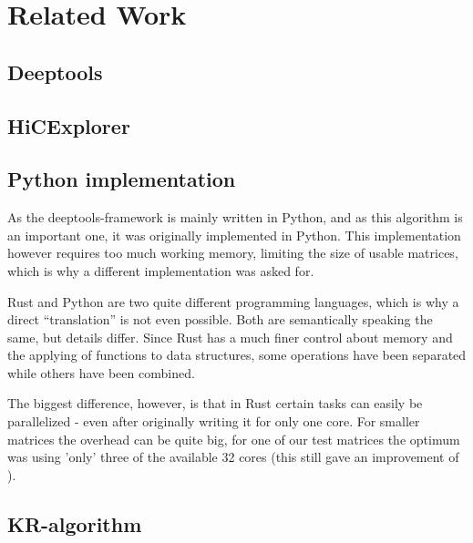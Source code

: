 \chapter{Related Work}\label{chap:relatedwork}


\section{Deeptools}\label{sec:deeptools}




\section{HiCExplorer}\label{sec:hicexplorer}

\section{Python implementation}\label{sec:python}

As the deeptools-framework is mainly written in Python, and as this algorithm
is an important one, it was originally implemented in Python. This
implementation however requires too much working memory, limiting the size of
usable matrices, which is why a different implementation was asked for.

Rust and Python are two quite different programming languages, which is why a
direct ``translation'' is not even possible. Both are semantically speaking the
same, but details differ. Since Rust has a much finer control about memory and
the applying of functions to data structures, some operations have been
separated while others have been combined.

The biggest difference, however, is that in Rust certain tasks can easily be
parallelized - even after originally writing it for only one core. For smaller
matrices the overhead can be quite big, for one of our test matrices the optimum was using 'only' three of the available 32 cores (this still gave an improvement of ).


\section{KR-algorithm}\label{sec:KR}


